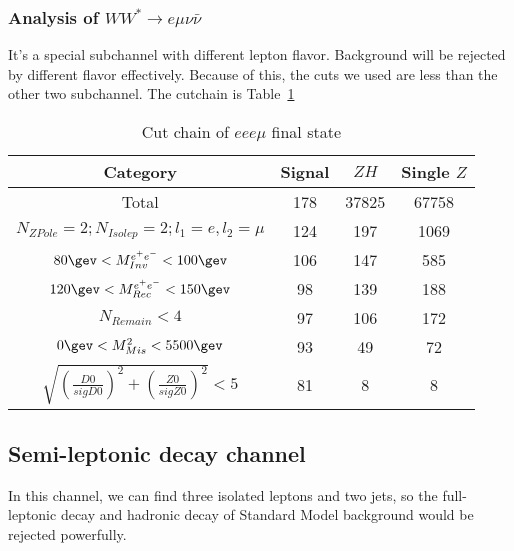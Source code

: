 \documentclass[11pt,a4paper]{cepcnote}
\begin{document}
\subsubsection{Analysis of $WW^*\rightarrow e\mu\nu\bar{\nu}$}
It's a special subchannel with different lepton flavor. 
Background will be rejected by different flavor effectively.
Because of this, the cuts we used are less than the other two subchannel.
The cutchain is Table~\ref{tab:eucutchain}
\begin{table}[H]
  \begin{center}
    \begin{tabular}{cccc}
      \hline \hline
      \multicolumn{1}{c}{Category}      & \multicolumn{1}{c}{Signal}&\multicolumn{1}{c}{$ZH$}&\multicolumn{1}{c}{Single $Z$}\\ 
      \hline
      Total		       	 									&  178	& 37825	& 67758\\
      $N_{ZPole}=2; N_{Isolep}=2; l_1 = e, l_2 = \mu$	 	&  124	& 197	& 1069\\
      $80\gev < M_{Inv}^{e^+e^-} < 100\gev$         		&  106	& 147	& 585\\
	  $120\gev < M_{Rec}^{e^+e^-} < 150\gev$        		&  98 	& 139	& 188\\
	  $N_{Remain} < 4$										&  97	& 106	& 172\\
	  $0\gev < M_{Mis}^{2} < 5500\gev$		        		&  93 	& 49 	& 72\\
	  $\sqrt{(\frac{D0}{sigD0})^2+(\frac{Z0}{sigZ0})^2} < 5$&  81 	& 8		& 8\\
      \hline \hline
    \end{tabular}
   \caption[Monte Carlo purities in the single lepton sample]{Cut chain of $ee e\mu$ final state}
  \label{tab:eucutchain}
 \end{center}
\end{table}

\subsection{Semi-leptonic decay channel}
In this channel, we can find three isolated leptons and two jets, 
so the full-leptonic decay and hadronic decay of Standard Model background would be rejected powerfully.
\end{document}
